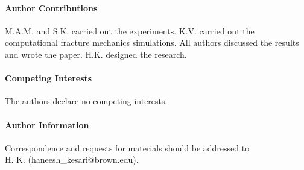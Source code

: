 \documentclass[12pt,onecolumn]{article}
\begin{document}
\paragraph{Author Contributions} M.A.M. and S.K. carried out the experiments.  K.V. carried out the computational fracture mechanics simulations. All authors discussed the results and wrote the paper. H.K. designed the research.

\paragraph{Competing Interests} The authors declare no competing interests.

\paragraph{Author Information} Correspondence and requests for materials should be addressed to \\ H. K. (haneesh\_kesari@brown.edu).
\end{document}
